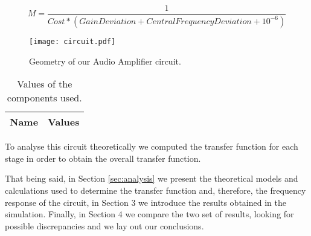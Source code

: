 \begin{equation}
\label{eqn:merit}
M=\frac{1}{Cost*(Gain Deviation+Central Frequency Deviation+10^{-6})}
\end{equation}

\begin{figure}[h] \centering
\texttt{[image: circuit.pdf]}
\caption{Geometry of our Audio Amplifier circuit.}
\label{fig:circuit1}
\end{figure}

\begin{table}[h!]
  \centering
  \begin{tabular}{|l|r|}
    \hline    
    {\bf Name} & {\bf Values} \\ \hline
     
  \end{tabular}
  \caption{Values of the components used.}
  \label{tab:circuit}
\end{table}

To analyse this circuit theoretically we computed the transfer function for each stage in order to obtain the overall transfer function.

That being said, in Section \ref{sec:analysis} we present the theoretical models and calculations used to determine the transfer function and, therefore, the frequency response of the circuit, in Section 3 we introduce the results obtained in the simulation. Finally, in Section 4 we compare the two set of results, looking for possible discrepancies and we lay out our conclusions.
